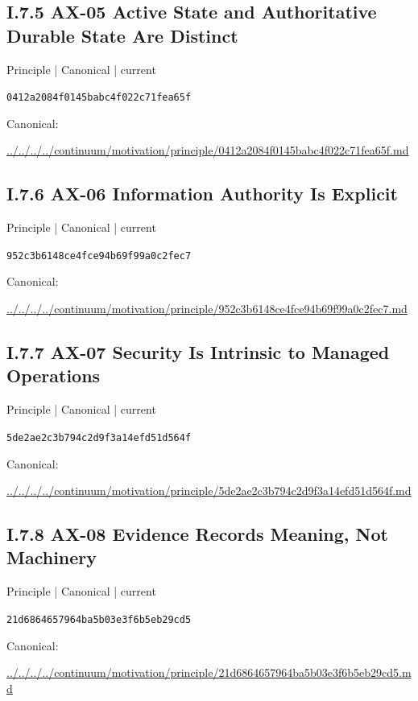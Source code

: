 \documentclass[10pt,a4paper]{article}
\begin{document}
\subsection*{I.7.5 AX-05 Active State and Authoritative Durable State Are Distinct}
\label{element-0412a2084f0145babc4f022c71fea65f}
{\small Principle | Canonical | current}\par
\texttt{0412a2084f0145babc4f022c71fea65f}\par
Canonical: \par
{\footnotesize\url{../../../../continuum/motivation/principle/0412a2084f0145babc4f022c71fea65f.md}}\par
\subsection*{I.7.6 AX-06 Information Authority Is Explicit}
\label{element-952c3b6148ce4fce94b69f99a0c2fec7}
{\small Principle | Canonical | current}\par
\texttt{952c3b6148ce4fce94b69f99a0c2fec7}\par
Canonical: \par
{\footnotesize\url{../../../../continuum/motivation/principle/952c3b6148ce4fce94b69f99a0c2fec7.md}}\par
\subsection*{I.7.7 AX-07 Security Is Intrinsic to Managed Operations}
\label{element-5de2ae2c3b794c2d9f3a14efd51d564f}
{\small Principle | Canonical | current}\par
\texttt{5de2ae2c3b794c2d9f3a14efd51d564f}\par
Canonical: \par
{\footnotesize\url{../../../../continuum/motivation/principle/5de2ae2c3b794c2d9f3a14efd51d564f.md}}\par
\subsection*{I.7.8 AX-08 Evidence Records Meaning, Not Machinery}
\label{element-21d6864657964ba5b03e3f6b5eb29cd5}
{\small Principle | Canonical | current}\par
\texttt{21d6864657964ba5b03e3f6b5eb29cd5}\par
Canonical: \par
{\footnotesize\url{../../../../continuum/motivation/principle/21d6864657964ba5b03e3f6b5eb29cd5.md}}\par
\end{document}
